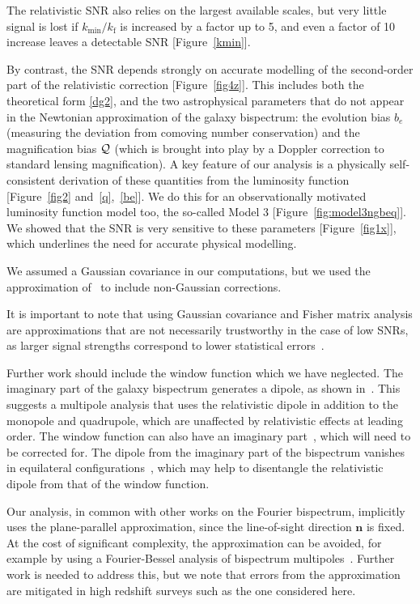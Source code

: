 The relativistic SNR also relies  on the largest available scales, but very little signal is lost if $k_{\mathrm{min}}/k_{\mathrm{f}}$ is increased by a factor up  to 5, and even a factor of 10 increase leaves a detectable SNR  [Figure~\ref{kmin}].

By contrast, the SNR depends strongly on accurate modelling of the second-order part of the relativistic correction  [Figure~\ref{fig4z}]. This includes both the theoretical form \eqref{dg2}, and the
two astrophysical parameters that do not appear in the Newtonian approximation of the galaxy bispectrum: the evolution bias $b_e$ (measuring the deviation from comoving number conservation) and the magnification bias $\mathcal{Q}$ (which is brought into play by a Doppler correction to standard lensing magnification).  A key feature of our analysis is a physically self-consistent derivation of these quantities from the luminosity function [Figure~\ref{fig2} and~\eqref{q},~\eqref{be}]. We do this for an observationally motivated luminosity function model too, the so-called Model 3 [Figure~\ref{fig:model3ngbeq}].
We showed that the SNR is very sensitive to these parameters [Figure~\ref{fig1x}], which underlines the need for accurate physical modelling. 

We assumed a Gaussian covariance in our computations, but we used the approximation  of~\cite{Chan:2016ehg} to include non-Gaussian corrections. 

It is important to note that using Gaussian covariance and Fisher matrix analysis are approximations that are not necessarily trustworthy in the case of low SNRs, as larger signal strengths correspond to lower statistical errors~\cite{Vallisneri:2007ev}.

Further work should include the window function which we have neglected.
The imaginary part of the galaxy bispectrum generates a dipole, as shown in~\cite{Clarkson:2018dwn}. This suggests a multipole analysis that uses the relativistic dipole in addition to the monopole and quadrupole, {which are unaffected by relativistic effects at leading order.} The
window function can also have an imaginary part~\cite{Beutler:2018vpe}, which will need to be corrected for. The dipole from the imaginary part of the bispectrum vanishes in equilateral configurations~\cite{Clarkson:2018dwn}, which may help to disentangle the relativistic dipole from that of the window function.

{Our analysis, in common with other works on the Fourier bispectrum, implicitly uses the plane-parallel approximation, since the line-of-sight direction ${\bm{n}}$ is fixed. At the cost of significant complexity, the approximation can be avoided, for example by using a Fourier-Bessel analysis of bispectrum multipoles~\cite{Castorina:2017inr}. Further work is needed to address this, but we note that errors from the approximation are mitigated in high redshift surveys such as the one considered here.}

